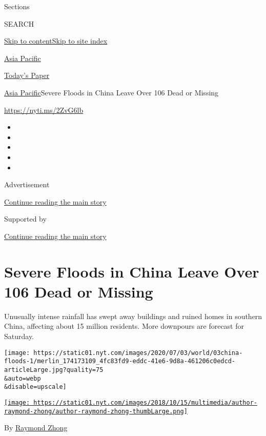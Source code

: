 Sections

SEARCH

\protect\hyperlink{site-content}{Skip to
content}\protect\hyperlink{site-index}{Skip to site index}

\href{https://www.nytimes.com/section/world/asia}{Asia Pacific}

\href{https://myaccount.nytimes.com/auth/login?response_type=cookie\&client_id=vi}{}

\href{https://www.nytimes.com/section/todayspaper}{Today's Paper}

\href{/section/world/asia}{Asia Pacific}\textbar{}Severe Floods in China
Leave Over 106 Dead or Missing

\url{https://nyti.ms/2ZvG6lb}

\begin{itemize}
\item
\item
\item
\item
\item
\end{itemize}

Advertisement

\protect\hyperlink{after-top}{Continue reading the main story}

Supported by

\protect\hyperlink{after-sponsor}{Continue reading the main story}

\hypertarget{severe-floods-in-china-leave-over-106-dead-or-missing}{%
\section{Severe Floods in China Leave Over 106 Dead or
Missing}\label{severe-floods-in-china-leave-over-106-dead-or-missing}}

Unusually intense rainfall has swept away buildings and ruined homes in
southern China, affecting about 15 million residents. More downpours are
forecast for Saturday.

\texttt{[image: https://static01.nyt.com/images/2020/07/03/world/03china-floods-1/merlin\_174173109\_4fc83fd9-eddc-41e6-9d8a-461206c0edcd-articleLarge.jpg?quality=75\\\&auto=webp\\\&disable=upscale]}

\href{https://www.nytimes.com/by/raymond-zhong}{\texttt{[image: https://static01.nyt.com/images/2018/10/15/multimedia/author-raymond-zhong/author-raymond-zhong-thumbLarge.png]}}

By \href{https://www.nytimes.com/by/raymond-zhong}{Raymond Zhong}

